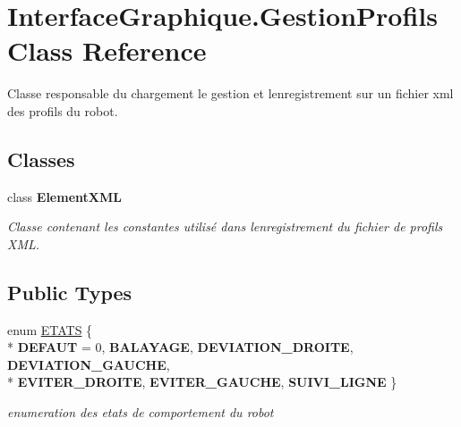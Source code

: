\hypertarget{class_interface_graphique_1_1_gestion_profils}{}\section{Interface\+Graphique.\+Gestion\+Profils Class Reference}
\label{class_interface_graphique_1_1_gestion_profils}


Classe responsable du chargement le gestion et l\textquotesingle{}enregistrement sur un fichier xml des profils du robot.  


\subsection*{Classes}
\begin{DoxyCompactItemize}
\item 
class {\bfseries Element\+X\+ML}
\begin{DoxyCompactList}\small\item\em Classe contenant les constantes utilisé dans l\textquotesingle{}enregistrement du fichier de profils X\+ML. \end{DoxyCompactList}\end{DoxyCompactItemize}
\subsection*{Public Types}
\begin{DoxyCompactItemize}
\item 
enum \hyperlink{group__inf2990_gad63ae859c24061076ed6dbe35f4671b5}{E\+T\+A\+TS} \{ \\*
{\bfseries D\+E\+F\+A\+UT} = 0, 
{\bfseries B\+A\+L\+A\+Y\+A\+GE}, 
{\bfseries D\+E\+V\+I\+A\+T\+I\+O\+N\+\_\+\+D\+R\+O\+I\+TE}, 
{\bfseries D\+E\+V\+I\+A\+T\+I\+O\+N\+\_\+\+G\+A\+U\+C\+HE}, 
\\*
{\bfseries E\+V\+I\+T\+E\+R\+\_\+\+D\+R\+O\+I\+TE}, 
{\bfseries E\+V\+I\+T\+E\+R\+\_\+\+G\+A\+U\+C\+HE}, 
{\bfseries S\+U\+I\+V\+I\+\_\+\+L\+I\+G\+NE}
 \}\hypertarget{group__inf2990_gad63ae859c24061076ed6dbe35f4671b5}{}\label{group__inf2990_gad63ae859c24061076ed6dbe35f4671b5}
\begin{DoxyCompactList}\small\item\em enumeration des etats de comportement du robot \end{DoxyCompactList}
\end{DoxyCompactItemize}
